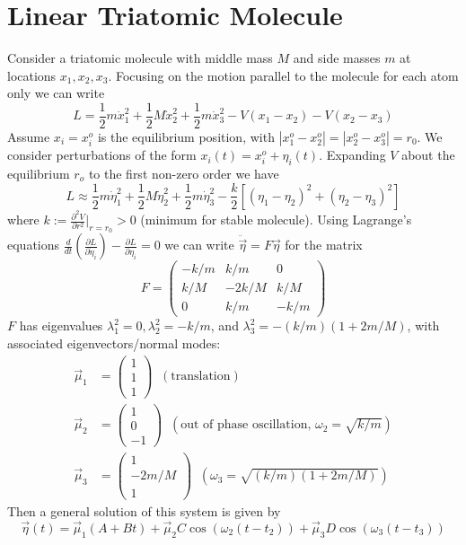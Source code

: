 \documentclass[12pt, a4paper, oneside, openright, titlepage]{book}
\begin{document}
\section{Linear Triatomic Molecule}


Consider a triatomic molecule with middle mass $M$ and side masses $m$ at locations $x_1,x_2,x_3$. Focusing on the  motion parallel to the molecule for each atom only we can write \begin{equation*}
    L = \frac{1}{2}m\dot{x}_1^2 + \frac{1}{2}M\dot{x}_2^2 + \frac{1}{2}m\dot{x}_3^2 - V(x_1-x_2) - V(x_2-x_3)
\end{equation*}
Assume $x_i = x_i^o$ is the equilibrium position, with $|x_1^o-x_2^o| = |x_2^o-x_3^o| = r_0$. We consider perturbations of the form $x_i(t) = x_i^o +\eta_i(t)$. Expanding $V$ about the equilibrium $r_o$ to the first non-zero order we have \begin{equation*}
    L \approx \frac{1}{2}m\dot{\eta}_1^2 + \frac{1}{2}M\dot{\eta}_2^2 + \frac{1}{2}m\dot{\eta}_3^2 - \frac{k}{2}\left[(\eta_1-\eta_2)^2+(\eta_2-\eta_3)^2\right]
\end{equation*}
where $k := \frac{\partial^2V}{\partial r^2}\Bigg\rvert_{r=r_0} > 0$ (minimum for stable molecule). Using Lagrange's equations $\frac{d}{dt}\left(\frac{\partial L}{\partial \dot{\eta}_i}\right) - \frac{\partial L}{\partial \eta_i} = 0$ we can write $\ddot{\vec{\eta}} = F\vec{\eta}$ for the matrix \begin{equation*}
    F = \begin{pmatrix} -k/m & k/m & 0 \\ k/M & -2k/M & k/M \\ 0 & k/m & -k/m \end{pmatrix}
\end{equation*}
$F$ has eigenvalues $\lambda_1^2 = 0, \lambda_2^2 = -k/m$, and $\lambda_3^2 = -(k/m)(1+2m/M)$, with associated eigenvectors/normal modes: \begin{align*}
    \vec{\mu}_1 &= \begin{pmatrix} 1 \\ 1 \\ 1\end{pmatrix} \;\;(\text{translation}) \\
        \vec{\mu}_2 &= \begin{pmatrix} 1 \\ 0 \\ -1 \end{pmatrix} \;\;(\text{out of phase oscillation, }\omega_2 = \sqrt{k/m}) \\
    \vec{\mu}_3 &= \begin{pmatrix} 1 \\ -2m/M \\ 1 \end{pmatrix}\;\;(\omega_3 = \sqrt{(k/m)(1+2m/M)})
\end{align*}
Then a general solution of this system is given by \begin{equation*}
    \vec{\eta}(t) = \vec{\mu}_1(A+Bt) + \vec{\mu}_2C\cos(\omega_2(t-t_2)) + \vec{\mu}_3D\cos(\omega_3(t-t_3))
\end{equation*}
\end{document}
